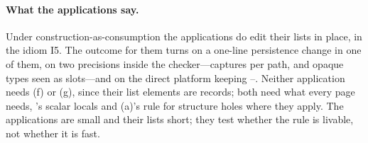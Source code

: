 \paragraph{What the applications say.} Under construction-as-consumption the applications do edit their
lists in place, in the idiom I5. The outcome for them turns on a one-line persistence change in one of
them, on two precisions inside the checker---captures per path, and opaque types seen as slots---and on
the direct platform keeping --. Neither application needs (f) or (g), since their
list elements are records; both need what every page needs, 's scalar locals and (a)'s rule for
structure holes where they apply. The applications are small and their lists short; they test whether
the rule is livable, not whether it is fast.
